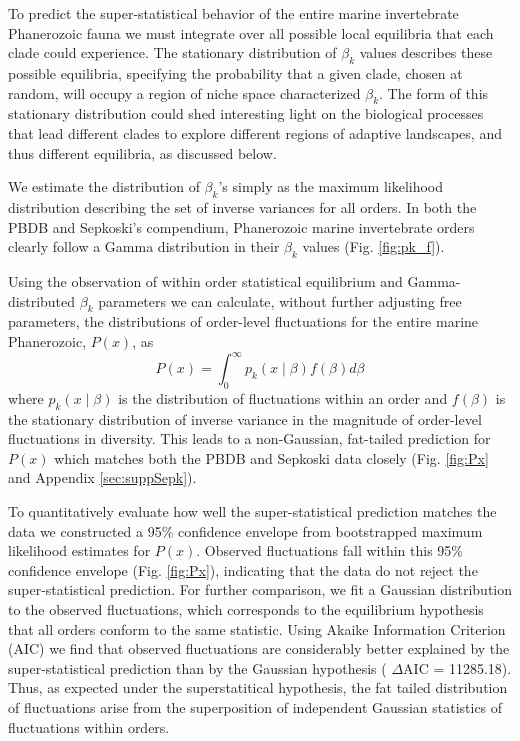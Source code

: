 \documentclass[12pt]{article}
\begin{document}
To predict the super-statistical behavior of the entire marine
invertebrate Phanerozoic fauna we must integrate over all possible
local equilibria that each clade could experience. The stationary
distribution of $\beta_k$ values describes these possible equilibria,
specifying the probability that a given clade, chosen at random, will
occupy a region of niche space characterized $\beta_k$. The form of
this stationary distribution could shed interesting light on the
biological processes that lead different clades to explore different
regions of adaptive landscapes, and thus different equilibria, as
discussed below.

We estimate the distribution of $\beta_k$'s simply as the maximum
likelihood distribution describing the set of inverse variances for
all orders. In both the PBDB and Sepkoski's compendium, Phanerozoic
marine invertebrate orders clearly follow a Gamma distribution in
their $\beta_k$ values (Fig. \ref{fig:pk_f}).  

Using the observation of within order statistical equilibrium and
Gamma-distributed $\beta_k$ parameters we can calculate, without
further adjusting free parameters, the distributions of order-level
fluctuations for the entire marine Phanerozoic, $P(x)$, as
\begin{equation}
  P(x) = \int_0^\infty p_k(x \mid \beta) f(\beta) d\beta \label{eq:PxInt}
\end{equation}
where $p_k(x \mid \beta)$ is the distribution of fluctuations within
an order and $f(\beta)$ is the stationary distribution of inverse
variance in the magnitude of order-level fluctuations in
diversity. This leads to a non-Gaussian, fat-tailed prediction for
$P(x)$ which matches both the PBDB and Sepkoski data closely
(Fig. \ref{fig:Px} and Appendix \ref{sec:suppSepk}).

To quantitatively evaluate how well the super-statistical prediction
matches the data we constructed a 95\% confidence envelope from
bootstrapped maximum likelihood estimates for $P(x)$. Observed
fluctuations fall within this 95\% confidence envelope
(Fig. \ref{fig:Px}), indicating that the data do not reject the
super-statistical prediction. For further comparison, we fit a
Gaussian distribution to the observed fluctuations, which corresponds
to the equilibrium hypothesis that all orders conform to the same
statistic. Using Akaike Information Criterion (AIC) we find that
observed fluctuations are considerably better explained by the
super-statistical prediction than by the Gaussian hypothesis ({\small
  $\Delta$}AIC = 11285.18). Thus, as expected under the
superstatitical hypothesis, the fat tailed distribution of
fluctuations arise from the superposition of independent Gaussian
statistics of fluctuations within orders.
\end{document}
